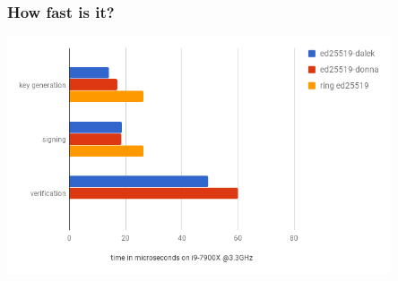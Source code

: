 \documentclass[xetex,aspectratio=169]{beamer}
\newcommand{\ZZ}{\mathbb{Z}}
\newcommand{\uniformsample}{\xleftarrow\$}
\begin{document}
  \begin{frame}
    \frametitle{How fast is it?}

    \begin{center}
      \includegraphics[height=7cm]{chart.png}
    \end{center}

  \end{frame}







\end{document}
